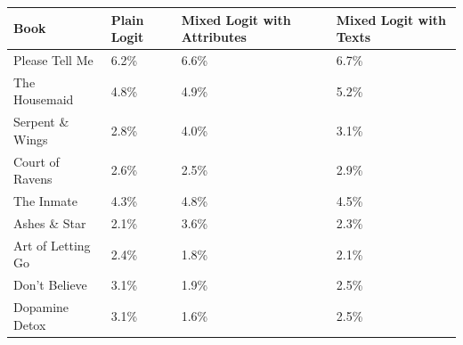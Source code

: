 \begin{centering}
\begin{tabular}{>{\raggedright}p{5cm}>{\raggedright}p{2cm}>{\centering}p{2cm}>{\centering}p{2cm}}
\hline
{\footnotesize\textbf{Book}} & {\footnotesize\textbf{Plain Logit}} & {\footnotesize\textbf{Mixed Logit with Attributes}} & {\footnotesize\textbf{Mixed Logit with Texts}}\tabularnewline
\hline
{\footnotesize Please Tell Me} & {\footnotesize 6.2\%} & {\footnotesize 6.6\%} & {\footnotesize 6.7\%}\tabularnewline
{\footnotesize The Housemaid} & {\footnotesize 4.8\%} & {\footnotesize 4.9\%} & {\footnotesize 5.2\%}\tabularnewline
{\footnotesize Serpent \& Wings} & {\footnotesize 2.8\%} & {\footnotesize 4.0\%} & {\footnotesize 3.1\%}\tabularnewline
{\footnotesize Court of Ravens} & {\footnotesize 2.6\%} & {\footnotesize 2.5\%} & {\footnotesize 2.9\%}\tabularnewline
{\footnotesize The Inmate} & {\footnotesize 4.3\%} & {\footnotesize 4.8\%} & {\footnotesize 4.5\%}\tabularnewline
{\footnotesize Ashes \& Star} & {\footnotesize 2.1\%} & {\footnotesize 3.6\%} & {\footnotesize 2.3\%}\tabularnewline
{\footnotesize Art of Letting Go} & {\footnotesize 2.4\%} & {\footnotesize 1.8\%} & {\footnotesize 2.1\%}\tabularnewline
{\footnotesize Don't Believe} & {\footnotesize 3.1\%} & {\footnotesize 1.9\%} & {\footnotesize 2.5\%}\tabularnewline
{\footnotesize Dopamine Detox} & {\footnotesize 3.1\%} & {\footnotesize 1.6\%} & {\footnotesize 2.5\%}\tabularnewline
\hline
\end{tabular}
\par\end{centering}